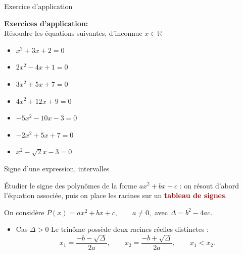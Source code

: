 \documentclass[aspectratio=169,11pt]{beamer}
\newcommand{\important}[1]{\textcolor{DarkRed}{\textbf{#1}}}
\begin{document}
	\begin{frame}{Exercice d'application}
		\begin{applicationbox}
			\textbf{Exercices d'application:} \\
			Résoudre les équations suivantes, d'inconnue $ x \in \mathbb{R}$
			\begin{itemize}
				\item $ x^2+3 x+2=0$  \\
				\item $ 2 x^2-4 x+1=0$  \\
				\item $ 3 x^2+5 x+7=0$  \\
				\item $ 4 x^2+12 x+9=0$  \\
				\item $-5 x^2-10 x-3=0$  \\
				\item $-2 x^2+5 x+7=0$  \\
				\item $ x^2-\sqrt{2} x-3 =0$
			\end{itemize}
			
		\end{applicationbox}
	\end{frame}
	
	
	
	
	\begin{frame}{Signe d'une expression, intervalles}
		\begin{definitionbox}
			Étudier le signe des polynômes de la forme $ax^2+bx+c$ : on résout d'abord l'équation associée, puis on
			place les racines sur un \important{tableau de signes}.
		\end{definitionbox}
		
		\pause
		
		On considère $	P(x)=ax^2+bx+c,\qquad a\neq0,$ avec $	\Delta=b^2-4ac.$
		
		\begin{itemize}
			\item Cas $\Delta>0$
			Le trinôme possède deux racines réelles distinctes :
			\[
			x_1=\frac{-b-\sqrt{\Delta}}{2a},
			\qquad
			x_2=\frac{-b+\sqrt{\Delta}}{2a},
			\qquad x_1<x_2.
			\]
		\end{itemize}
	\end{frame}
	
\end{document}
